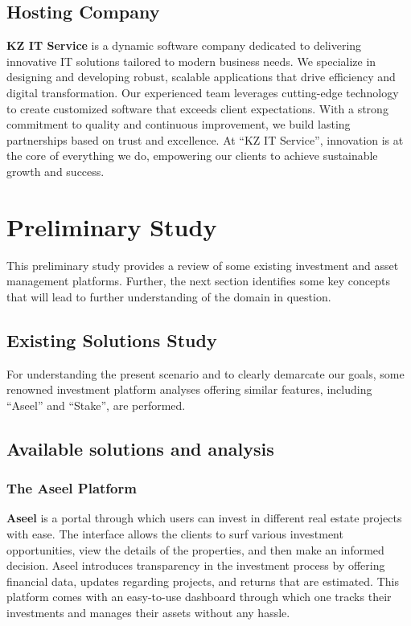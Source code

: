 \subsection{Hosting Company}

\textbf{\textcolor{primary}{KZ IT Service}} is a dynamic software company dedicated to delivering innovative IT solutions tailored to modern business needs. We specialize in designing and developing robust, scalable applications that drive efficiency and digital transformation. Our experienced team leverages cutting-edge technology to create customized software that exceeds client expectations. With a strong commitment to quality and continuous improvement, we build lasting partnerships based on trust and excellence. At ``KZ IT Service'', innovation is at the core of everything we do, empowering our clients to achieve sustainable growth and success.

\section{Preliminary Study}

This preliminary study provides a review of some existing investment and asset management platforms. Further, the next section identifies some key concepts that will lead to further understanding of the domain in question.

\subsection{Existing Solutions Study}

For understanding the present scenario and to clearly demarcate our goals, some renowned investment platform analyses offering similar features, including ``Aseel'' and ``Stake'', are performed.
\newpage
\thispagestyle{empty}
\newpage

\subsection{Available solutions and analysis}

\subsubsection{The Aseel Platform}

\textbf{\textcolor{primary}{Aseel}} is a portal through which users can invest in different real estate projects with ease. The interface allows the clients to surf various investment opportunities, view the details of the properties, and then make an informed decision. Aseel introduces transparency in the investment process by offering financial data, updates regarding projects, and returns that are estimated. This platform comes with an easy-to-use dashboard through which one tracks their investments and manages their assets without any hassle.

